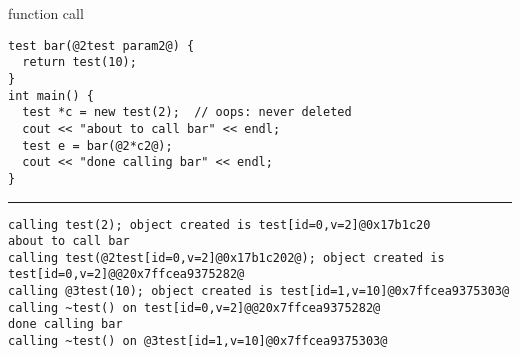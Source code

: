 \begin{frame}[fragile,label=testbar]{function call}
\begin{lstlisting}
test bar(@2test param2@) {
  return test(10);
}
int main() {
  test *c = new test(2);  // oops: never deleted
  cout << "about to call bar" << endl;
  test e = bar(@2*c2@);
  cout << "done calling bar" << endl;
}
\end{lstlisting}
\hrule
{}
\begin{lstlisting}
calling test(2); object created is test[id=0,v=2]@0x17b1c20
about to call bar
calling test(@2test[id=0,v=2]@0x17b1c202@); object created is test[id=0,v=2]@@20x7ffcea9375282@
calling @3test(10); object created is test[id=1,v=10]@0x7ffcea9375303@
calling ~test() on test[id=0,v=2]@@20x7ffcea9375282@
done calling bar
calling ~test() on @3test[id=1,v=10]@0x7ffcea9375303@
\end{lstlisting}
\end{frame}

